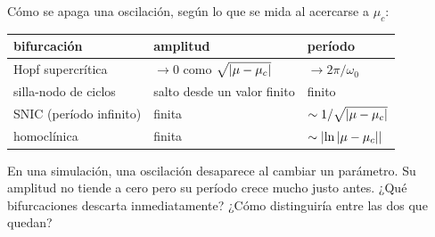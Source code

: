 \begin{ideaclave}
Cómo se apaga una oscilación, según lo que se mida al acercarse a $\mu_c$:
\begin{center}
\begin{tabular}{@{}lll@{}}
\toprule
\textbf{bifurcación} & \textbf{amplitud} & \textbf{período}\\
\midrule
Hopf supercrítica & $\to0$ como $\sqrt{\left\lvert \mu-\mu_c\right\rvert}$ & $\to2\pi/\omega_0$\\
silla-nodo de ciclos & salto desde un valor finito & finito\\
SNIC (período infinito) & finita & $\sim1/\sqrt{\left\lvert \mu-\mu_c\right\rvert}$\\
homoclínica & finita & $\sim\left\lvert \ln\left\lvert \mu-\mu_c\right\rvert\right\rvert$\\
\bottomrule
\end{tabular}
\end{center}
\end{ideaclave}

\begin{pausa}
En una simulación, una oscilación desaparece al cambiar un parámetro. Su amplitud no tiende a cero pero su período crece mucho justo antes. ¿Qué bifurcaciones descarta inmediatamente? ¿Cómo distinguiría entre las dos que quedan?
\end{pausa}
